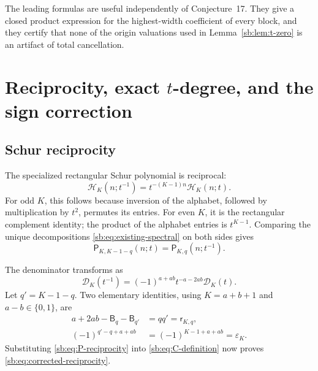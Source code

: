 \documentclass[11pt]{article}
\theoremstyle{definition}
\theoremstyle{remark}
\newcommand{\Ht}{\mathcal H}
\newcommand{\Den}{\mathcal D}
\newcommand{\Pblock}{\mathsf P}
\newcommand{\Btri}{\mathsf B}
\newcommand{\rdeg}{\mathsf r}
\newcommand{\epsK}{\varepsilon}
\theoremstyle{definition}
\theoremstyle{plain}
\numberwithin{equation}{section}
\begin{document}
The leading formulas are useful independently of Conjecture~17.  They give a
closed product expression for the highest-width coefficient of every block,
and they certify that none of the origin valuations used in
Lemma~\ref{sb:lem:t-zero} is an artifact of total cancellation.

\section{Reciprocity, exact \texorpdfstring{$t$}{t}-degree, and the sign correction}
\label{sb:sec:reciprocity}

\subsection{Schur reciprocity}
The specialized rectangular Schur polynomial is reciprocal:
\begin{equation}
 \Ht_K(n;t^{-1})=t^{-(K-1)n}\Ht_K(n;t).
 \label{sb:eq:H-reciprocity}
\end{equation}
For odd $K$, this follows because inversion of the alphabet, followed by
multiplication by $t^2$, permutes its entries.  For even $K$, it is the
rectangular complement identity; the product of the alphabet entries is
$t^{K-1}$.  Comparing the unique decompositions
\eqref{sb:eq:existing-spectral} on both sides gives
\begin{equation}
 \Pblock_{K,K-1-q}(n;t)=\Pblock_{K,q}(n;t^{-1}).
 \label{sb:eq:P-reciprocity}
\end{equation}


The denominator transforms as
\begin{equation}
 \Den_K(t^{-1})=(-1)^{a+ab}t^{-a-2ab}\Den_K(t).
 \label{sb:eq:D-reciprocity}
\end{equation}
Let $q'=K-1-q$.  Two elementary identities, using $K=a+b+1$ and
$a-b\in\{0,1\}$, are
\begin{align}
 a+2ab-\Btri_q-\Btri_{q'}&=qq'=\rdeg_{K,q},
 \label{sb:eq:power-identity}\\
 (-1)^{q'-q+a+ab}&=(-1)^{K-1+a+ab}=\epsK_K.
 \label{sb:eq:sign-identity}
\end{align}
Substituting \eqref{sb:eq:P-reciprocity} into \eqref{sb:eq:C-definition} now proves
\eqref{sb:eq:corrected-reciprocity}.
\end{document}
